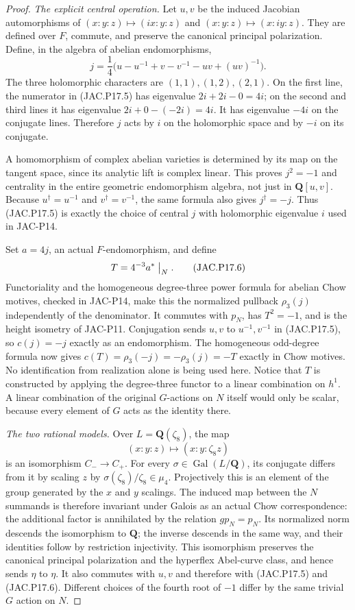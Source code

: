 \begin{proof}
\emph{The explicit central operation.}
Let $u,v$ be the induced Jacobian automorphisms of
$(x:y:z)\mapsto(ix:y:z)$ and $(x:y:z)\mapsto(x:iy:z)$.
They are defined over $F$, commute, and preserve the canonical
principal polarization. Define, in the algebra of abelian
endomorphisms,
\[
 j=\frac14\bigl(u-u^{-1}+v-v^{-1}-uv+(uv)^{-1}\bigr).
                                                               \tag{JAC.P17.5}
\]
The three holomorphic characters are $(1,1),(1,2),(2,1)$.
On the first line, the numerator in (JAC.P17.5) has eigenvalue
$2i+2i-0=4i$; on the second and third lines it has eigenvalue
$2i+0-(-2i)=4i$. It has eigenvalue $-4i$ on the conjugate
lines. Therefore $j$ acts by $i$ on the holomorphic space and
by $-i$ on its conjugate.

A homomorphism of complex abelian varieties is determined by
its map on the tangent space, since its analytic lift is complex
linear. This proves $j^2=-1$ and centrality in the entire
geometric endomorphism algebra, not just in $\mathbf Q[u,v]$.
Because $u^\dagger=u^{-1}$ and $v^\dagger=v^{-1}$, the same
formula also gives $j^\dagger=-j$. Thus (JAC.P17.5) is exactly
the choice of central $j$ with holomorphic eigenvalue $i$ used
in JAC-P14.

Set $a=4j$, an actual $F$-endomorphism, and define
\[
                  T=4^{-3}a^*\bigm|_N.                \tag{JAC.P17.6}
\]
Functoriality and the homogeneous degree-three power formula
for abelian Chow motives, checked in JAC-P14, make this the
normalized pullback $\rho_3(j)$ independently of the denominator.
It commutes with $p_N$, has $T^2=-1$, and is the height isometry
of JAC-P11. Conjugation sends $u,v$ to $u^{-1},v^{-1}$ in
(JAC.P17.5), so $c(j)=-j$ exactly as an endomorphism.
The homogeneous odd-degree formula now gives
$c(T)=\rho_3(-j)=-\rho_3(j)=-T$ exactly in Chow motives.
No identification from realization alone is being used here.
Notice that $T$ is constructed by applying the degree-three
functor to a linear combination on $h^1$. A linear combination
of the original $G$-actions on $N$ itself would only be scalar,
because every element of $G$ acts as the identity there.

\emph{The two rational models.}
Over $L=\mathbf Q(\zeta_8)$, the map
\[
             (x:y:z)\longmapsto(x:y:\zeta_8z)
                                                               \tag{JAC.P17.7}
\]
is an isomorphism $C_-\to C_+$. For every
$\sigma\in\operatorname{Gal}(L/\mathbf Q)$, its conjugate
differs from it by scaling $z$ by
$\sigma(\zeta_8)/\zeta_8\in\mu_4$. Projectively this is an
element of the group generated by the $x$ and $y$ scalings.
The induced map between the $N$ summands is therefore invariant
under Galois as an actual Chow correspondence: the additional
factor is annihilated by the relation $gp_N=p_N$.
Its normalized norm descends the isomorphism to $\mathbf Q$;
the inverse descends in the same way, and their identities follow
by restriction injectivity. This isomorphism preserves the
canonical principal polarization and the hyperflex Abel-curve
class, and hence sends $\eta$ to $\eta$. It also commutes with
$u,v$ and therefore with (JAC.P17.5) and (JAC.P17.6).
Different choices of the fourth root of $-1$ differ by the same
trivial $G$ action on $N$.


\end{proof}
